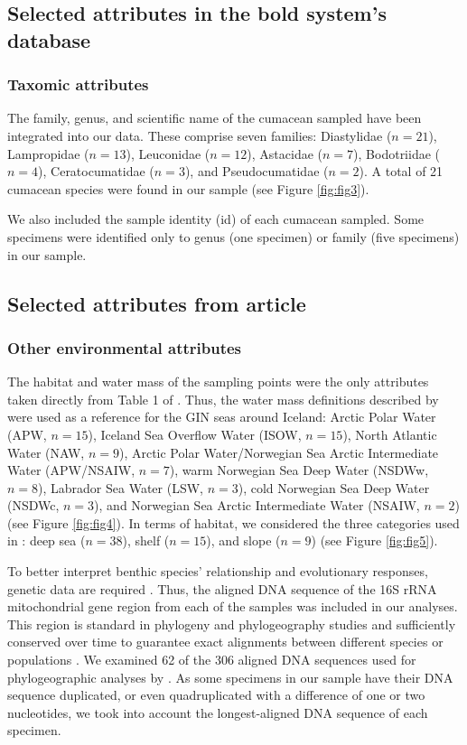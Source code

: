 \subsection{Selected attributes in the bold system's database}
\subsubsection{Taxomic attributes} 
The family, genus, and scientific name of the cumacean sampled have been integrated into our data. These comprise seven families: Diastylidae ($n=21$), Lampropidae ($n=13$), Leuconidae ($n=12$), Astacidae ($n=7$), Bodotriidae ($n=4$), Ceratocumatidae ($n=3$), and Pseudocumatidae ($n=2$). A total of 21 cumacean species were found in our sample (see Figure \ref{fig:fig3}).

We also included the sample identity (id) of each cumacean sampled. Some specimens were identified only to genus (one specimen) or family (five specimens) in our sample.

\subsection{Selected attributes from article \cite{uhlir_adding_2021}} 
\subsubsection{Other environmental attributes} 
The habitat and water mass of the sampling points were the only attributes taken directly from Table 1 of \citep{uhlir_adding_2021}. Thus, the water mass definitions described by \citep{hansen_north_2000, brix2010distribution, ostmann_marine_2014} were used as a reference for the GIN seas around Iceland: Arctic Polar Water (APW, $n=15$), Iceland Sea Overflow Water (ISOW, $n=15$), North Atlantic Water (NAW, $n=9$), Arctic Polar Water/Norwegian Sea Arctic Intermediate Water (APW/NSAIW, $n=7$), warm Norwegian Sea Deep Water (NSDWw, $n=8$), Labrador Sea Water (LSW, $n=3$), cold Norwegian Sea Deep Water (NSDWc, $n=3$), and Norwegian Sea Arctic Intermediate Water (NSAIW, $n=2$) (see Figure \ref{fig:fig4}). In terms of habitat, we considered the three categories used in \citep{uhlir_adding_2021}: deep sea ($n=38$), shelf ($n=15$), and slope ($n=9$) (see Figure \ref{fig:fig5}).

To better interpret benthic species' relationship and evolutionary responses, genetic data are required \citep{wilson_speciation_1987, uhlir_adding_2021}. Thus, the aligned DNA sequence of the 16S rRNA mitochondrial gene region from each of the samples was included in our analyses. This region is standard in phylogeny and phylogeography studies \citep{hugenholtz1998impact} and sufficiently conserved over time to guarantee exact alignments between different species or populations \citep{saccone1999evolutionary}. We examined 62 of the 306 aligned DNA sequences used for phylogeographic analyses by \citep{uhlir_adding_2021}. As some specimens in our sample have their DNA sequence duplicated, or even quadruplicated with a difference of one or two nucleotides, we took into account the longest-aligned DNA sequence of each specimen.

